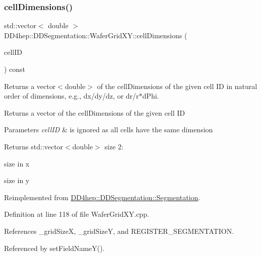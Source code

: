 \subsubsection{\texorpdfstring{cell\+Dimensions()}{cellDimensions()}}
{\footnotesize\ttfamily std\+::vector$<$ double $>$ D\+D4hep\+::\+D\+D\+Segmentation\+::\+Wafer\+Grid\+X\+Y\+::cell\+Dimensions (\begin{DoxyParamCaption}\item[{const \hyperlink{namespace_d_d4hep_1_1_d_d_segmentation_ac7af071d85cb48820914434a07e21ba1}{Cell\+ID} \&}]{cell\+ID }\end{DoxyParamCaption}) const\hspace{0.3cm}{\ttfamily [virtual]}}



Returns a vector$<$double$>$ of the cell\+Dimensions of the given cell ID in natural order of dimensions, e.\+g., dx/dy/dz, or dr/r$\ast$d\+Phi. 

Returns a vector of the cell\+Dimensions of the given cell ID 
\begin{DoxyParams}{Parameters}
{\em cell\+ID} & is ignored as all cells have the same dimension \\
\hline
\end{DoxyParams}
\begin{DoxyReturn}{Returns}
std\+::vector$<$double$>$ size 2\+:
\begin{DoxyEnumerate}
\item size in x
\item size in y 
\end{DoxyEnumerate}
\end{DoxyReturn}


Reimplemented from \hyperlink{class_d_d4hep_1_1_d_d_segmentation_1_1_segmentation_ac2119ba64c9805751e08b6100ef6fee6}{D\+D4hep\+::\+D\+D\+Segmentation\+::\+Segmentation}.



Definition at line 118 of file Wafer\+Grid\+X\+Y.\+cpp.



References \+\_\+grid\+SizeX, \+\_\+grid\+SizeY, and R\+E\+G\+I\+S\+T\+E\+R\+\_\+\+S\+E\+G\+M\+E\+N\+T\+A\+T\+I\+ON.



Referenced by set\+Field\+Name\+Y().

\hypertarget{class_d_d4hep_1_1_d_d_segmentation_1_1_wafer_grid_x_y_a5218281846eb9567e526cbaaeab85440}{}\label{class_d_d4hep_1_1_d_d_segmentation_1_1_wafer_grid_x_y_a5218281846eb9567e526cbaaeab85440} 
